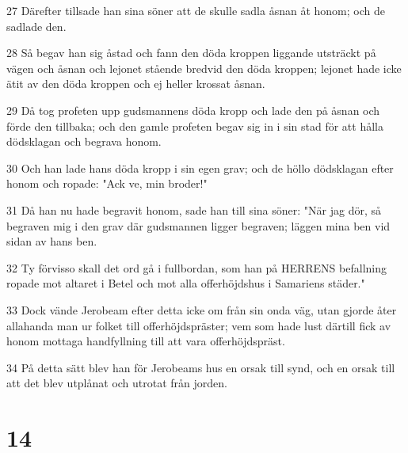 \par 27 Därefter tillsade han sina söner att de skulle sadla åsnan åt honom; och de sadlade den.
\par 28 Så begav han sig åstad och fann den döda kroppen liggande utsträckt på vägen och åsnan och lejonet stående bredvid den döda kroppen; lejonet hade icke ätit av den döda kroppen och ej heller krossat åsnan.
\par 29 Då tog profeten upp gudsmannens döda kropp och lade den på åsnan och förde den tillbaka; och den gamle profeten begav sig in i sin stad för att hålla dödsklagan och begrava honom.
\par 30 Och han lade hans döda kropp i sin egen grav; och de höllo dödsklagan efter honom och ropade: "Ack ve, min broder!"
\par 31 Då han nu hade begravit honom, sade han till sina söner: "När jag dör, så begraven mig i den grav där gudsmannen ligger begraven; läggen mina ben vid sidan av hans ben.
\par 32 Ty förvisso skall det ord gå i fullbordan, som han på HERRENS befallning ropade mot altaret i Betel och mot alla offerhöjdshus i Samariens städer."
\par 33 Dock vände Jerobeam efter detta icke om från sin onda väg, utan gjorde åter allahanda man ur folket till offerhöjdspräster; vem som hade lust därtill fick av honom mottaga handfyllning till att vara offerhöjdspräst.
\par 34 På detta sätt blev han för Jerobeams hus en orsak till synd, och en orsak till att det blev utplånat och utrotat från jorden.

\chapter{14}

